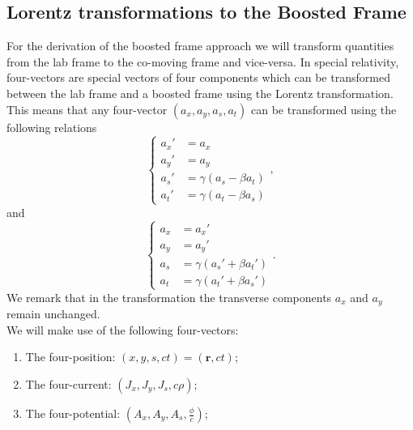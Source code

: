 \subsection{Lorentz transformations to the Boosted Frame}
For the derivation of the boosted frame approach we will transform quantities from the lab frame to the co-moving frame and vice-versa. 
In special relativity, four-vectors are special vectors of four components which can be transformed between the lab frame and a boosted frame using the Lorentz transformation. This means that any four-vector $\left(a_x, a_y, a_s, a_t\right)$ can be transformed using the following relations
\begin{equation*}
    \begin{cases}
        a_x' &= a_x\\
        a_y' &= a_y\\
        a_s' &= \gamma(a_s-\beta a_t)\\
        a_t' &=\gamma\left(a_t-\beta a_s\right)
    \end{cases},
\end{equation*}
and
\begin{equation*}
    \begin{cases}
        a_x &= a_x'\\
        a_y &= a_y'\\
        a_s &= \gamma(a_s'+\beta a_t')\\
        a_t &=\gamma\left(a_t'+\beta a_s'\right)
    \end{cases}.
\end{equation*}
We remark that in the transformation the transverse components $a_x$ and $a_y$ remain unchanged.\\
We will make use of the following four-vectors:
\begin{BoxedText*}
\begin{enumerate}
    \item The four-position: $\left(x,y,s,ct\right) = \left(\mathbf{r}, ct\right)$;
    \item The four-current: $\left(J_x, J_y, J_s, c\rho\right)$;
    \item The four-potential: $\left(A_x, A_y, A_s, \frac{\phi}{c}\right)$;
\end{enumerate}
\end{BoxedText*}
